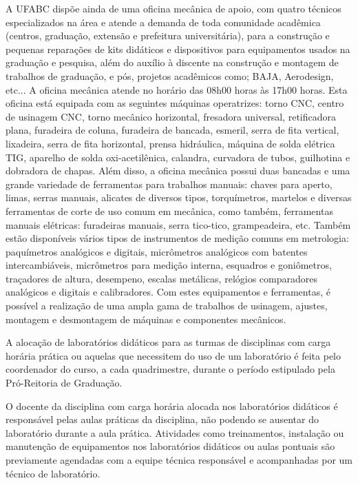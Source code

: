 A UFABC dispõe ainda de uma oficina mecânica de apoio, com quatro técnicos especializados na área e atende a demanda de toda comunidade acadêmica (centros, graduação, extensão e prefeitura universitária), para a construção e pequenas reparações de kits didáticos e dispositivos para equipamentos usados na graduação e pesquisa, além do auxílio à discente na construção e montagem de trabalhos de graduação, e pós, projetos acadêmicos como; BAJA, Aerodesign, etc... A oficina mecânica atende no horário das 08h00 horas às 17h00 horas. Esta oficina está equipada com as seguintes máquinas operatrizes: torno CNC, centro de usinagem CNC, torno mecânico horizontal, fresadora universal, retificadora plana, furadeira de coluna, furadeira de bancada, esmeril, serra de fita vertical, lixadeira, serra de fita horizontal, prensa hidráulica, máquina de solda elétrica TIG, aparelho de solda oxi-acetilênica, calandra, curvadora de tubos, guilhotina e dobradora de chapas. Além disso, a oficina mecânica possui duas bancadas e uma grande variedade de ferramentas para trabalhos manuais: chaves para aperto, limas, serras manuais, alicates de diversos tipos, torquímetros, martelos e diversas ferramentas de corte de uso comum em mecânica, como também, ferramentas manuais elétricas: furadeiras manuais, serra tico-tico, grampeadeira, etc. Também estão disponíveis vários tipos de instrumentos de medição comuns em metrologia: paquímetros analógicos e digitais, micrômetros analógicos com batentes intercambiáveis, micrômetros para medição interna, esquadros e goniômetros, traçadores de altura, desempeno, escalas metálicas, relógios comparadores analógicos e digitais e calibradores. Com estes equipamentos e ferramentas, é possível a realização de uma ampla gama de trabalhos de usinagem, ajustes, montagem e desmontagem de máquinas e componentes mecânicos.

A alocação de laboratórios didáticos para as turmas de disciplinas com carga horária prática ou aquelas que necessitem do uso de um laboratório é feita pelo coordenador do curso, a cada quadrimestre, durante o período estipulado pela Pró-Reitoria de Graduação.

O docente da disciplina com carga horária alocada nos laboratórios didáticos é responsável pelas aulas práticas da disciplina, não podendo se ausentar do laboratório durante a aula prática.
Atividades como treinamentos, instalação ou manutenção de equipamentos nos laboratórios didáticos ou aulas pontuais são previamente agendadas com a equipe técnica responsável e acompanhadas por um técnico de laboratório.

